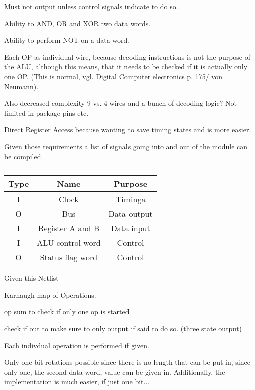 \begin{feat-requirement}
  Must not output unless control signals indicate to do so. 
\end{feat-requirement}

\begin{feat-requirement}
  Ability to AND, OR and XOR two data words.
\end{feat-requirement}

\begin{feat-requirement}
  Ability to perform NOT on a data word.
\end{feat-requirement}

Each OP as individual wire, because decoding instructions is not the purpose of the ALU, although this means, that it needs to be checked if it is actually only one OP. (This is normal, vgl. Digital Computer electronics p. 175/ von Neumann). 

Also decreased complexity 9 vs. 4 wires and a bunch of decoding logic? Not limited in package pins etc. 

Direct Register Access because wanting to save timing states and is more easier. 

Given those requirements a list of signals going into and out of the module can be compiled. 

\begin{table}[]
\begin{tabular}{ccc}
Type& Name & Purpose \\ \hline
I   & Clock & Timinga \\
O   & Bus     & Data output         \\
I   & Register A and B & Data input \\
I   & ALU control word & Control \\
O   & Status flag word & Control
\end{tabular}
\caption{}
\label{tab:alu-i/o}
\end{table}

Given this Netlist

Karnaugh map of Operations. 




op sum to check if only one op is started

check if out to make sure to only output if said to do so. (three state output)

Each indivdual operation is performed if given.

Only one bit rotations possible since there is no length that can be put in, since only one, the second data word, value can be given in. Additionally, the implementation is much easier, if just one bit...
